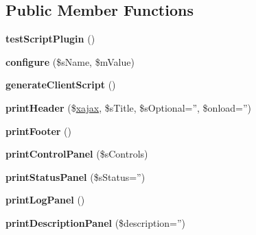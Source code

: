 \subsection*{Public Member Functions}
\begin{DoxyCompactItemize}
\item 
\hypertarget{classtestScriptPlugin_aa0c1e18f508ae1bc13e262b885633e08}{
{\bfseries testScriptPlugin} ()}
\label{classtestScriptPlugin_aa0c1e18f508ae1bc13e262b885633e08}

\item 
\hypertarget{classtestScriptPlugin_aab15868f9dce423b97340bc528258bdc}{
{\bfseries configure} (\$sName, \$mValue)}
\label{classtestScriptPlugin_aab15868f9dce423b97340bc528258bdc}

\item 
\hypertarget{classtestScriptPlugin_a5bfb46f037004c233f609de402bafa6f}{
{\bfseries generateClientScript} ()}
\label{classtestScriptPlugin_a5bfb46f037004c233f609de402bafa6f}

\item 
\hypertarget{classtestScriptPlugin_a8cbaaee14485a37ea203d2e78d9b849d}{
{\bfseries printHeader} (\$\hyperlink{classxajax}{xajax}, \$sTitle, \$sOptional='', \$onload='')}
\label{classtestScriptPlugin_a8cbaaee14485a37ea203d2e78d9b849d}

\item 
\hypertarget{classtestScriptPlugin_afac52995a6e30875b7384d8c09f2af8f}{
{\bfseries printFooter} ()}
\label{classtestScriptPlugin_afac52995a6e30875b7384d8c09f2af8f}

\item 
\hypertarget{classtestScriptPlugin_a7dab0db0c40785ee82ae156d0eca64ff}{
{\bfseries printControlPanel} (\$sControls)}
\label{classtestScriptPlugin_a7dab0db0c40785ee82ae156d0eca64ff}

\item 
\hypertarget{classtestScriptPlugin_a15aacf63c8614f01c64c472b93ce789e}{
{\bfseries printStatusPanel} (\$sStatus='')}
\label{classtestScriptPlugin_a15aacf63c8614f01c64c472b93ce789e}

\item 
\hypertarget{classtestScriptPlugin_a4ca2c053e19817f85a437e1eb6dabca7}{
{\bfseries printLogPanel} ()}
\label{classtestScriptPlugin_a4ca2c053e19817f85a437e1eb6dabca7}

\item 
\hypertarget{classtestScriptPlugin_aca61c53e0c64c993bea24e795b56d792}{
{\bfseries printDescriptionPanel} (\$description='')}
\label{classtestScriptPlugin_aca61c53e0c64c993bea24e795b56d792}

\end{DoxyCompactItemize}

